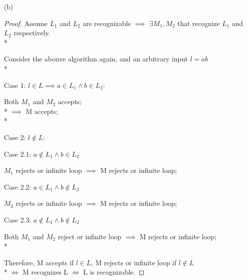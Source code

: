 \documentclass{article}
\begin{document}
(b)
\begin{proof}
    Assume $L_1$ and $L_2$ are recognizable $\implies$ $\exists M_1, M_2$ that recognize $L_1$ and $L_2$ respectively.\\*

    Consider the abouve algorithm again, and an arbitrary input $l=ab$\\*

    Case 1: $l \in L \implies a \in L_1 \land b \in L_2$:
    \begin{addmargin}[2em]{0em}
        Both $M_1$ and $M_2$ accepts; \\*
        $\implies$ M accepts;\\*
    \end{addmargin}

    Case 2: $l \notin L$:
    \begin{addmargin}[2em]{0em}
        Case 2.1: $a \notin L_1 \land b \in L_2$
        \begin{addmargin}[1em]{0em}
        $M_1$ rejects or infinite loop $\implies$ M rejects or infinite loop; 
        \end{addmargin}
        Case 2.2: $a \in L_1 \land b \notin L_2$
        \begin{addmargin}[1em]{0em}
        $M_2$ rejects or infinite loop $\implies$ M rejects or infinite loop;
        \end{addmargin}
        Case 2.3: $a \notin L_1 \land b \notin L_2$
        \begin{addmargin}[1em]{0em}
        Both $M_1$ and $M_2$ reject or infinite loop $\implies$ M rejects or infinite loop;\\*
        \end{addmargin}
    \end{addmargin}

    Therefore, M accepts if $l \in L$, M rejects or infinite loop if $l \notin L$ \\*
    $\iff$ M recognizes L $\iff$ L is recognizable.
\end{proof}
\end{document}
